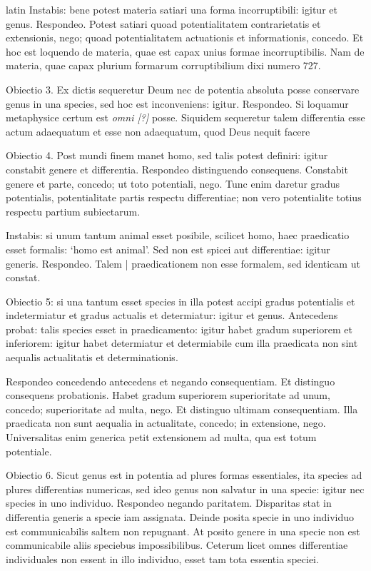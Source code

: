 \begin{otherlanguage*}{latin}
\pstart
Instabis:
bene potest materia satiari una forma incorruptibili:
igitur et genus. Respondeo. Potest satiari quoad potentialitatem contrarietatis et extensionis, nego; quoad potentialitatem actuationis et informationis, concedo. Et hoc est loquendo de materia, quae est capax unius formae incorruptibilis. Nam de materia, quae capax plurium formarum corruptibilium dixi numero 727. 
\pend

\pstart
Obiectio 3. Ex dictis sequeretur Deum nec de potentia absoluta posse conservare genus in una species, sed hoc est inconveniens:
igitur. Respondeo. Si loquamur metaphysice certum est \emph{omni [?]} posse. Siquidem sequeretur talem differentia esse actum adaequatum et esse non adaequatum, quod Deus nequit facere 
\pend

\pstart
Obiectio 4. Post mundi finem manet homo, sed talis potest definiri:
igitur constabit genere et differentia. Respondeo distinguendo consequens. Constabit genere et parte, concedo; ut toto potentiali, nego. Tunc enim daretur gradus potentialis, potentialitate partis respectu differentiae; non vero potentialite totius respectu partium subiectarum. 
\pend

\pstart
Instabis:
si unum tantum animal esset posibile, scilicet homo, haec praedicatio esset formalis:
`homo est animal'. Sed non est spicei aut differentiae:
igitur generis. Respondeo. Talem \textnormal{|} praedicationem non esse formalem, sed identicam ut constat. 
\pend

\pstart
Obiectio 5:
si una tantum esset species in illa potest accipi gradus potentialis et indetermiatur et gradus actualis et determiatur:
igitur et genus. Antecedens probat:
talis species esset in praedicamento:
igitur habet gradum superiorem et inferiorem:
igitur habet determiatur et determiabile cum illa praedicata non sint aequalis actualitatis et determinationis. 
\pend

\pstart
Respondeo concedendo antecedens et negando consequentiam. Et distinguo consequens probationis. Habet gradum superiorem superioritate ad unum, concedo; superioritate ad multa, nego. Et distinguo ultimam consequentiam. Illa praedicata non sunt aequalia in actualitate, concedo; in extensione, nego. Universalitas enim generica petit extensionem ad multa, qua est totum potentiale. 
\pend

\pstart
Obiectio 6. Sicut genus est in potentia ad plures formas essentiales, ita species ad plures differentias numericas, sed ideo genus non salvatur in una specie:
igitur nec species in uno individuo. Respondeo negando paritatem. Disparitas stat in differentia generis a specie iam assignata. Deinde posita specie in uno individuo est communicabilis saltem non repugnant. At posito genere in una specie non est communicabile aliis speciebus impossibilibus. Ceterum licet omnes differentiae individuales non essent in illo individuo, esset tam tota essentia speciei. 
\pend


\end{otherlanguage*}
